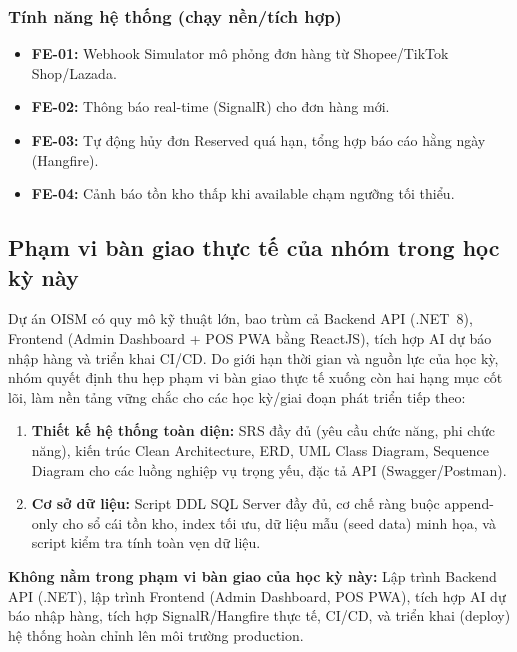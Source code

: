 \subsubsection{Tính năng hệ thống (chạy nền/tích hợp)}
\begin{itemize}
    \item \textbf{FE-01:} Webhook Simulator mô phỏng đơn hàng từ Shopee/TikTok Shop/Lazada.
    \item \textbf{FE-02:} Thông báo real-time (SignalR) cho đơn hàng mới.
    \item \textbf{FE-03:} Tự động hủy đơn Reserved quá hạn, tổng hợp báo cáo hằng ngày (Hangfire).
    \item \textbf{FE-04:} Cảnh báo tồn kho thấp khi available chạm ngưỡng tối thiểu.
\end{itemize}

\subsection{Phạm vi bàn giao thực tế của nhóm trong học kỳ này}

Dự án OISM có quy mô kỹ thuật lớn, bao trùm cả Backend API (.NET~8), Frontend (Admin Dashboard + POS PWA bằng ReactJS), tích hợp AI dự báo nhập hàng và triển khai CI/CD. Do giới hạn thời gian và nguồn lực của học kỳ, nhóm quyết định thu hẹp phạm vi bàn giao thực tế xuống còn hai hạng mục cốt lõi, làm nền tảng vững chắc cho các học kỳ/giai đoạn phát triển tiếp theo:

\begin{enumerate}
    \item \textbf{Thiết kế hệ thống toàn diện:} SRS đầy đủ (yêu cầu chức năng, phi chức năng), kiến trúc Clean Architecture, ERD, UML Class Diagram, Sequence Diagram cho các luồng nghiệp vụ trọng yếu, đặc tả API (Swagger/Postman).
    \item \textbf{Cơ sở dữ liệu:} Script DDL SQL Server đầy đủ, cơ chế ràng buộc append-only cho sổ cái tồn kho, index tối ưu, dữ liệu mẫu (seed data) minh họa, và script kiểm tra tính toàn vẹn dữ liệu.
\end{enumerate}

\textbf{Không nằm trong phạm vi bàn giao của học kỳ này:} Lập trình Backend API (.NET), lập trình Frontend (Admin Dashboard, POS PWA), tích hợp AI dự báo nhập hàng, tích hợp SignalR/Hangfire thực tế, CI/CD, và triển khai (deploy) hệ thống hoàn chỉnh lên môi trường production.

